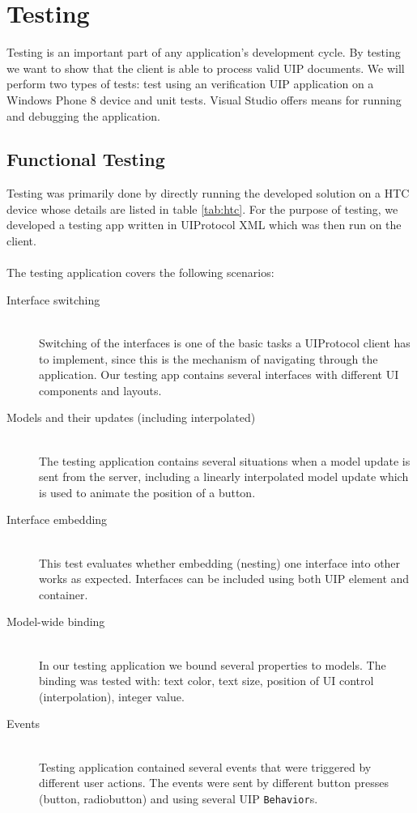 \chapter{Testing}
Testing is an important part of any application's development cycle. By testing we want to show that the client is able to process valid UIP documents. We will perform two types of tests: test using an verification UIP application on a Windows Phone 8 device and unit tests. Visual Studio offers means for running and debugging the application.

\section{Functional Testing}
Testing was primarily done by directly running the developed solution on a HTC device whose details are listed in table \ref{tab:htc}. For the purpose of testing, we developed a testing app written in UIProtocol XML which was then run on the client.\\\\
The testing application covers the following scenarios:\\

\begin{description}
\item[Interface switching] \hfill \\
  Switching of the interfaces is one of the basic tasks a UIProtocol client has to implement, since this is the mechanism of navigating through the application. Our testing app contains several interfaces with different UI components and layouts.
\item[Models and their updates (including interpolated)] \hfill \\
  The testing application contains several situations when a model update is sent from the server, including a linearly interpolated model update which is used to animate the position of a button.
  \item[Interface embedding] \hfill \\
  This test evaluates whether embedding (nesting) one interface into other works as expected. Interfaces can be included using both UIP element and container.
  \item[Model-wide binding] \hfill \\
  In our testing application we bound several properties to models. The binding was tested with: text color, text size, position of UI control (interpolation), integer value.
    \item[Events] \hfill \\
    Testing application contained several events that were triggered by different user actions. The events were sent by different button presses (button, radiobutton) and using several UIP \texttt{Behavior}s.
\end{description}

